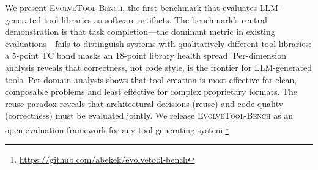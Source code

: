 \documentclass[10pt,twocolumn]{article}
\begin{document}
We present \textsc{EvolveTool-Bench}, the first benchmark that evaluates LLM-generated tool libraries as software artifacts. The benchmark's central demonstration is that task completion---the dominant metric in existing evaluations---fails to distinguish systems with qualitatively different tool libraries: a 5-point TC band masks an 18-point library health spread. Per-dimension analysis reveals that correctness, not code style, is the frontier for LLM-generated tools. Per-domain analysis shows that tool creation is most effective for clean, composable problems and least effective for complex proprietary formats. The reuse paradox reveals that architectural decisions (reuse) and code quality (correctness) must be evaluated jointly. We release \textsc{EvolveTool-Bench} as an open evaluation framework for any tool-generating system.\footnote{\url{https://github.com/abekek/evolvetool-bench}}



\end{document}
